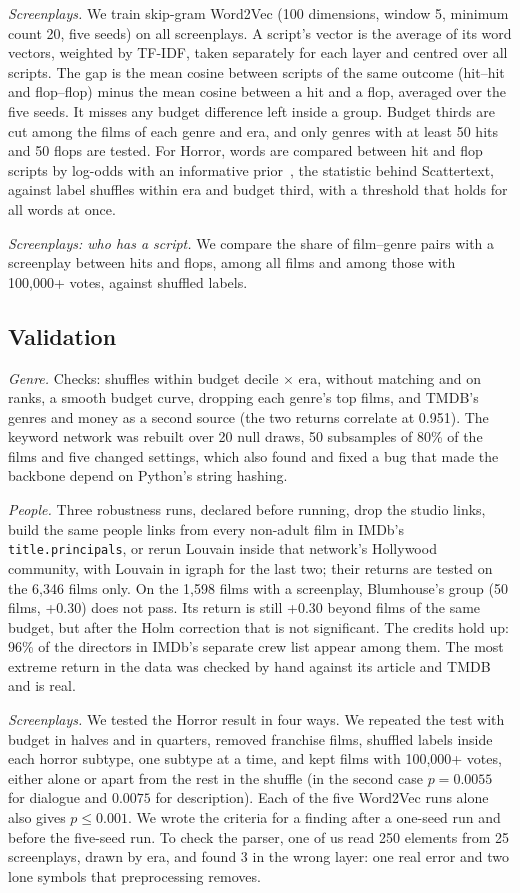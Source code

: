 \documentclass[9pt,twocolumn,twoside]{pnas-new}
\begin{document}
{\emph{Screenplays.} We train skip-gram Word2Vec (100 dimensions, window 5, minimum count 20, five seeds) on all screenplays. A script's vector is the average of its word vectors, weighted by TF-IDF, taken separately for each layer and centred over all scripts. The gap is the mean cosine between scripts of the same outcome (hit--hit and flop--flop) minus the mean cosine between a hit and a flop, averaged over the five seeds. It misses any budget difference left inside a group. Budget thirds are cut among the films of each genre and era, and only genres with at least 50 hits and 50 flops are tested. For Horror, words are compared between hit and flop scripts by log-odds with an informative prior~\cite{monroe2008fightin}, the statistic behind Scattertext, against label shuffles within era and budget third, with a threshold that holds for all words at once.


\emph{Screenplays: who has a script.} We compare the share of film--genre pairs with a screenplay between hits and flops, among all films and among those with 100,000+ votes, against shuffled labels.

\subsection*{Validation}
\emph{Genre.} Checks: shuffles within budget decile $\times$ era, without matching and on ranks, a smooth budget curve, dropping each genre's top films, and TMDB's genres and money as a second source (the two returns correlate at 0.951). The keyword network was rebuilt over 20 null draws, 50 subsamples of 80\% of the films and five changed settings, which also found and fixed a bug that made the backbone depend on Python's string hashing.

\emph{People.} Three robustness runs, declared before running, drop the studio links, build the same people links from every non-adult film in IMDb's \texttt{title.principals}, or rerun Louvain inside that network's Hollywood community, with Louvain in igraph for the last two; their returns are tested on the 6,346 films only. On the 1,598 films with a screenplay, Blumhouse's group (50 films, +0.30) does not pass. Its return is still +0.30 beyond films of the same budget, but after the Holm correction that is not significant. The credits hold up: 96\% of the directors in IMDb's separate crew list appear among them. The most extreme return in the data was checked by hand against its article and TMDB and is real.

\emph{Screenplays.} We tested the Horror result in four ways. We repeated the test with budget in halves and in quarters, removed franchise films, shuffled labels inside each horror subtype, one subtype at a time, and kept films with 100,000+ votes, either alone or apart from the rest in the shuffle (in the second case $p=0.0055$ for dialogue and $0.0075$ for description). Each of the five Word2Vec runs alone also gives $p\le0.001$. We wrote the criteria for a finding after a one-seed run and before the five-seed run. To check the parser, one of us read 250 elements from 25 screenplays, drawn by era, and found 3 in the wrong layer: one real error and two lone symbols that preprocessing removes.
}
\end{document}
